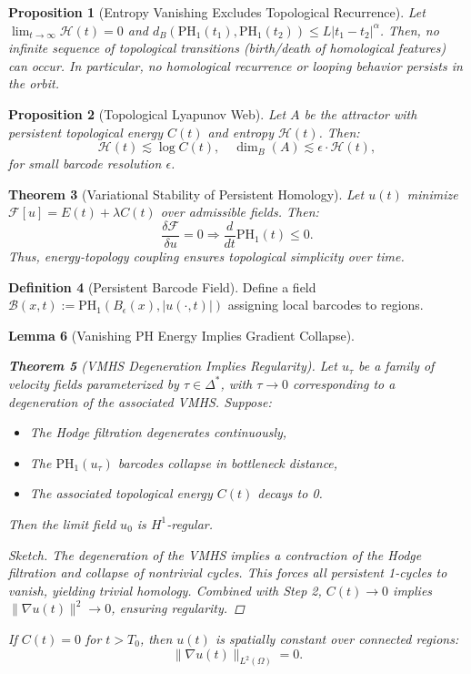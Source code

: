 \documentclass[11pt]{article}
\newtheorem{theorem}{Theorem}[section]
\newtheorem{lemma}[theorem]{Lemma}
\newtheorem{proposition}[theorem]{Proposition}
\theoremstyle{definition}
\newtheorem{definition}[theorem]{Definition}
\begin{document}
\begin{proposition}[Entropy Vanishing Excludes Topological Recurrence]
Let $\lim_{t \to \infty} \mathcal{H}(t) = 0$ and $d_B(\mathrm{PH}_1(t_1), \mathrm{PH}_1(t_2)) \le L |t_1 - t_2|^\alpha$. Then, no infinite sequence of topological transitions (birth/death of homological features) can occur. In particular, no homological recurrence or looping behavior persists in the orbit.
\end{proposition}

\begin{proposition}[Topological Lyapunov Web]
Let $A$ be the attractor with persistent topological energy $C(t)$ and entropy $\mathcal{H}(t)$. Then:
\[
\mathcal{H}(t) \lesssim \log C(t), \quad \dim_B(A) \lesssim \epsilon \cdot \mathcal{H}(t),
\]
for small barcode resolution $\epsilon$.
\end{proposition}

\begin{theorem}[Variational Stability of Persistent Homology]
Let $u(t)$ minimize $\mathcal{F}[u] = E(t) + \lambda C(t)$ over admissible fields. Then:
\[
\frac{\delta \mathcal{F}}{\delta u} = 0 \Rightarrow \frac{d}{dt} \mathrm{PH}_1(t) \le 0.
\]
Thus, energy-topology coupling ensures topological simplicity over time.
\end{theorem}

\begin{definition}[Persistent Barcode Field]
Define a field $\mathcal{B}(x,t) := \mathrm{PH}_1(B_\epsilon(x), |u(\cdot,t)|)$ assigning local barcodes to regions.
\end{definition}

\begin{lemma}[Vanishing PH Energy Implies Gradient Collapse]

\begin{theorem}[VMHS Degeneration Implies Regularity]
Let $u_\tau$ be a family of velocity fields parameterized by $\tau \in \Delta^*$, with $\tau \to 0$ corresponding to a degeneration of the associated VMHS. Suppose:
\begin{itemize}
    \item The Hodge filtration degenerates continuously,
    \item The $\mathrm{PH}_1(u_\tau)$ barcodes collapse in bottleneck distance,
    \item The associated topological energy $C(t)$ decays to 0.
\end{itemize}
Then the limit field $u_0$ is $H^1$-regular.
\end{theorem}

\begin{proof}[Sketch]
The degeneration of the VMHS implies a contraction of the Hodge filtration and collapse of nontrivial cycles. This forces all persistent 1-cycles to vanish, yielding trivial homology. Combined with Step 2, $C(t) \to 0$ implies $\|\nabla u(t)\|^2 \to 0$, ensuring regularity.
\end{proof}
        If $C(t) = 0$ for $t > T_0$, then $u(t)$ is spatially constant over connected regions:
\[
\|\nabla u(t)\|_{L^2(\Omega)} = 0.
\]
\end{lemma}
\end{document}
